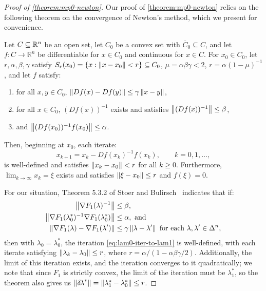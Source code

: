 \documentclass[eikonal.tex]{subfiles}
\begin{document}
\begin{proof}[Proof of \cref{theorem:mp0-newton}]
  Our proof of \cref{theorem:mp0-newton} relies on the following
  theorem on the convergence of Newton's method, which we present for
  convenience.

  \begin{theorem}\label{thm:stoer-bulirsch}
    Let $C \subseteq \mathbb{R}^n$ be an open set, let $C_0$ be a convex set
    with $\overline{C}_0 \subseteq C$, and let
    $f : C \to \mathbb{R}^n$ be differentiable for $x \in C_0$ and
    continuous for $x \in C$. For $x_0 \in C_0$, let
    $r, \alpha, \beta, \gamma$ satisfy
    $S_r(x_0) = \left\{x : \left\|x - x_0\right\| < r\right\} \subseteq C_0$,
    $\mu = \alpha\beta\gamma < 2$, $r = \alpha(1 - \mu)^{-1}$, and let
    $f$ satisfy:
    \begin{enumerate}[label=(\alph*)]
    \item for all $x, y \in C_0$,
      $\left\|D f(x) - D f(y)\right\| \leq \gamma \left\|x - y\right\|$,
    \item for all $x \in C_0$, $(D f(x))^{-1}$ exists and satisfies
      $\left\|(Df(x))^{-1}\right\| \leq \beta$,
    \item and $\left\|(Df(x_0))^{-1} f(x_0)\right\| \leq \alpha$.
    \end{enumerate}
    Then, beginning at $x_0$, each iterate:
    \begin{equation}
      x_{k+1} = x_k - Df(x_k)^{-1} f(x_k), \qquad k = 0, 1, \hdots,
    \end{equation}
    is well-defined and satisfies $\left\|x_k - x_0\right\| < r$ for all
    $k \geq 0$. Furthermore, $\lim_{k \to \infty} x_k = \xi$ exists and
    satisfies $\left\|\xi - x_0\right\| \leq r$ and $f(\xi) = 0$.
  \end{theorem}

  For our situation, Theorem 5.3.2 of Stoer and
  Bulirsch~\cite{stoer2013introduction} indicates that if:
  \begin{align}
    \norm{\nabla F_1(\lambda)^{-1}} &\leq \beta,\label{item:sb-newton-1} \\
    \norm{\nabla F_1(\lambda_0^*)^{-1} \nabla F_1(\lambda_0^*)} &\leq \alpha,\label{item:sb-newton-2} \mbox{ and} \\
    \norm{\nabla F_1(\lambda) - \nabla F_1(\lambda')} &\leq \gamma \norm{\lambda - \lambda'} \mbox{ for each } \lambda, \lambda' \in \Delta^n,\label{item:sb-newton-3}
  \end{align}
  then with $\lambda_0 = \lambda_0^*$, the iteration
  \cref{eq:lam0-iter-to-lam1} is well-defined, with each iterate
  satisfying $\left\|\lambda_k - \lambda_0\right\| \leq r$, where
  $r = \alpha/(1 - \alpha\beta\gamma/2)$. Additionally, the limit of
  this iteration exists, and the iteration converges to it
  quadratically; we note that since $F_1$ is strictly convex, the
  limit of the iteration must be $\lambda_1^*$, so the theorem also
  gives us
  $\left\|{\delta \hspace{-0.1em} \lambda}^*\right\| = \left\|\lambda_1^* - \lambda_0^*\right\| \leq r$.


\end{proof}
\end{document}
